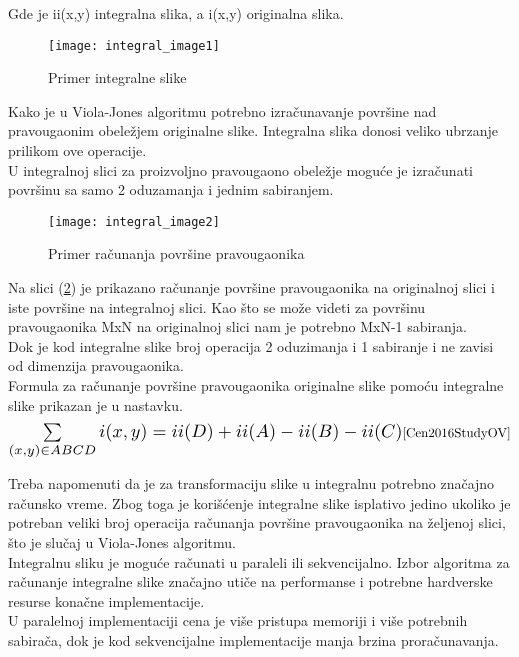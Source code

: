 Gde je ii(x,y) integralna slika, a i(x,y) originalna slika. \\

\begin{figure}[H]
  \centering
  \texttt{[image: integral\_image1]}
  \caption{Primer integralne slike}
  \label{IntegralImage_img1}
\end{figure}

Kako je u Viola-Jones algoritmu potrebno izračunavanje površine nad pravougaonim
obeležjem originalne slike.
Integralna slika donosi veliko ubrzanje prilikom ove operacije. \\
U integralnoj slici za proizvoljno pravougaono obeležje moguće je izračunati
površinu sa samo 2 oduzamanja i jednim sabiranjem. \\

\begin{figure}[H]
  \centering
  \texttt{[image: integral\_image2]}
  \caption{Primer računanja površine pravougaonika \cite{IntegralImage1_web}}
  \label{IntegralImage_img2}
\end{figure}

Na slici (\ref{IntegralImage_img2}) je prikazano računanje površine pravougaonika na
originalnoj slici i iste površine na integralnoj slici.
Kao što se može videti za površinu pravougaonika MxN na originalnoj slici nam je
potrebno MxN-1 sabiranja. \\
Dok je kod integralne slike broj operacija 2 oduzimanja i 1 sabiranje i ne
zavisi od dimenzija pravougaonika. \\

Formula za računanje površine pravougaonika originalne slike pomoću integralne
slike prikazan je u nastavku. \\

\begin{equation}
  \Scale[1.4]{\sum\limits_{(x,y)\in ABCD} i(x,y)=ii(D)+ii(A)-ii(B)-ii(C)}
  \cite{Cen2016StudyOV}
  \label{IntegralImage_eq2}
\end{equation}

Treba napomenuti da je za transformaciju slike u integralnu potrebno značajno
računsko vreme.
Zbog toga je korišćenje integralne slike isplativo jedino ukoliko je potreban
veliki broj operacija računanja površine pravougaonika na željenoj slici, što je
slučaj u Viola-Jones algoritmu. \\

Integralnu sliku je moguće računati u paraleli ili
sekvencijalno. Izbor algoritma za računanje integralne slike značajno utiče na
performanse i potrebne hardverske resurse konačne implementacije. \\
U paralelnoj implementaciji cena je više pristupa memoriji i više potrebnih sabirača, dok je kod sekvencijalne
implementacije manja brzina proračunavanja. \\


